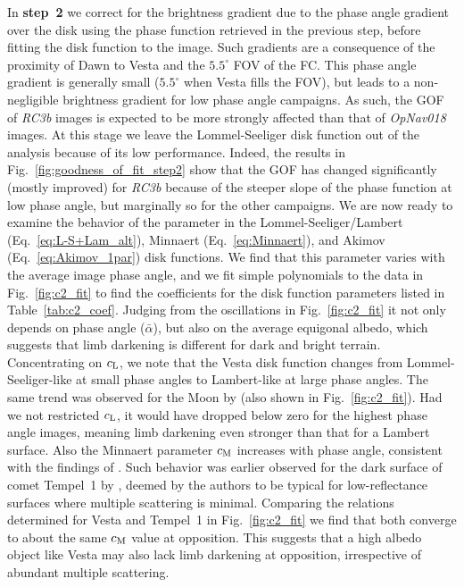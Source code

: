 \documentclass[3p,authoryear]{elsarticle}
\begin{document}
In {\bf step~2} we correct for the brightness gradient due to the phase angle gradient over the disk using the phase function retrieved in the previous step, before fitting the disk function to the image. Such gradients are a consequence of the proximity of Dawn to Vesta and the $5.5^\circ$ FOV of the FC. This phase angle gradient is generally small ($5.5^\circ$ when Vesta fills the FOV), but leads to a non-negligible brightness gradient for low phase angle campaigns. As such, the GOF of {\it RC3b} images is expected to be more strongly affected than that of {\it OpNav018} images. At this stage we leave the Lommel-Seeliger disk function out of the analysis because of its low performance. Indeed, the results in Fig.~\ref{fig:goodness_of_fit_step2} show that the GOF has changed significantly (mostly improved) for {\it RC3b} because of the steeper slope of the phase function at low phase angle, but marginally so for the other campaigns. We are now ready to examine the behavior of the parameter in the Lommel-Seeliger/Lambert (Eq.~\ref{eq:L-S+Lam_alt}), Minnaert (Eq.~\ref{eq:Minnaert}), and Akimov (Eq.~\ref{eq:Akimov_1par}) disk functions. We find that this parameter varies with the average image phase angle, and we fit simple polynomials to the data in Fig.~\ref{fig:c2_fit} to find the coefficients for the disk function parameters listed in Table~\ref{tab:c2_coef}. Judging from the oscillations in Fig.~\ref{fig:c2_fit} it not only depends on phase angle ($\bar{\alpha}$), but also on the average equigonal albedo, which suggests that limb darkening is different for dark and bright terrain. Concentrating on $c_{\rm L}$, we note that the Vesta disk function changes from Lommel-Seeliger-like at small phase angles to Lambert-like at large phase angles. The same trend was observed for the Moon by \citet{McE96} (also shown in Fig.~\ref{fig:c2_fit}). Had we not restricted $c_{\rm L}$, it would have dropped below zero for the highest phase angle images, meaning limb darkening even stronger than that for a Lambert surface. Also the Minnaert parameter $c_{\rm M}$ increases with phase angle, consistent with the findings of \citet{L13}. Such behavior was earlier observed for the dark surface of comet Tempel~1 by \citet{Li12}, deemed by the authors to be typical for low-reflectance surfaces where multiple scattering is minimal. Comparing the relations determined for Vesta and Tempel~1 in Fig.~\ref{fig:c2_fit} we find that both converge to about the same $c_{\rm M}$ value at opposition. This suggests that a high albedo object like Vesta may also lack limb darkening at opposition, irrespective of abundant multiple scattering.
\end{document}

